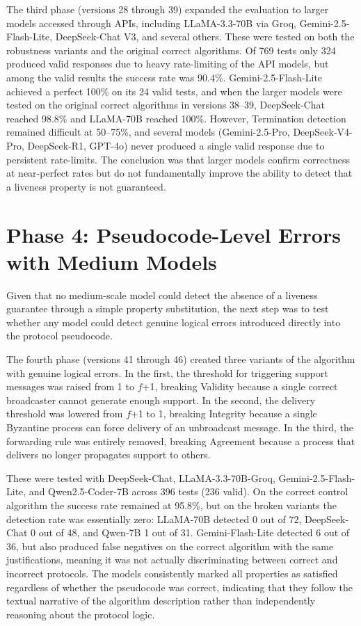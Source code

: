 \documentclass[conference]{IEEEtran}
\begin{document}
The third phase (versions 28 through 39) expanded the evaluation to larger models accessed through APIs, including LLaMA-3.3-70B via Groq, Gemini-2.5-Flash-Lite, DeepSeek-Chat V3, and several others. These were tested on both the robustness variants and the original correct algorithms. Of 769 tests only 324 produced valid responses due to heavy rate-limiting of the API models, but among the valid results the success rate was 90.4\%. Gemini-2.5-Flash-Lite achieved a perfect 100\% on its 24 valid tests, and when the larger models were tested on the original correct algorithms in versions 38--39, DeepSeek-Chat reached 98.8\% and LLaMA-70B reached 100\%. However, Termination detection remained difficult at 50--75\%, and several models (Gemini-2.5-Pro, DeepSeek-V4-Pro, DeepSeek-R1, GPT-4o) never produced a single valid response due to persistent rate-limits. The conclusion was that larger models confirm correctness at near-perfect rates but do not fundamentally improve the ability to detect that a liveness property is not guaranteed.

\section{Phase 4: Pseudocode-Level Errors with Medium Models}

Given that no medium-scale model could detect the absence of a liveness guarantee through a simple property substitution, the next step was to test whether any model could detect genuine logical errors introduced directly into the protocol pseudocode.

The fourth phase (versions 41 through 46) created three variants of the algorithm with genuine logical errors. In the first, the threshold for triggering support messages was raised from 1 to $f$+1, breaking Validity because a single correct broadcaster cannot generate enough support. In the second, the delivery threshold was lowered from $f$+1 to 1, breaking Integrity because a single Byzantine process can force delivery of an unbroadcast message. In the third, the forwarding rule was entirely removed, breaking Agreement because a process that delivers no longer propagates support to others.

These were tested with DeepSeek-Chat, LLaMA-3.3-70B-Groq, Gemini-2.5-Flash-Lite, and Qwen2.5-Coder-7B across 396 tests (236 valid). On the correct control algorithm the success rate remained at 95.8\%, but on the broken variants the detection rate was essentially zero: LLaMA-70B detected 0 out of 72, DeepSeek-Chat 0 out of 48, and Qwen-7B 1 out of 31. Gemini-Flash-Lite detected 6 out of 36, but also produced false negatives on the correct algorithm with the same justifications, meaning it was not actually discriminating between correct and incorrect protocols. The models consistently marked all properties as satisfied regardless of whether the pseudocode was correct, indicating that they follow the textual narrative of the algorithm description rather than independently reasoning about the protocol logic.
\end{document}
